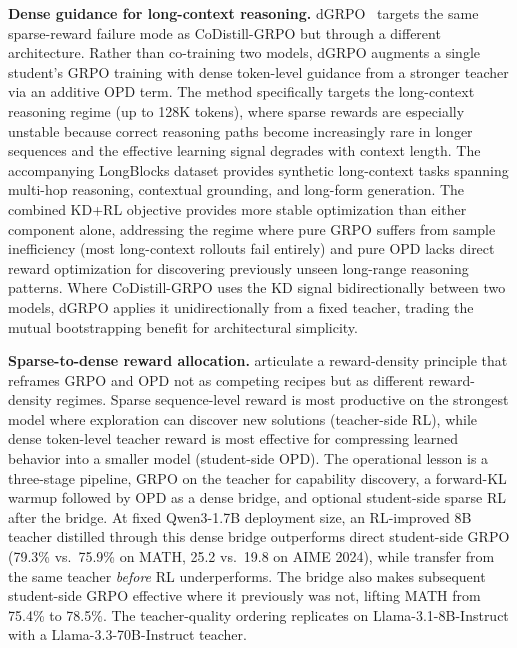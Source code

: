\documentclass{article} %
\begin{document}
\textbf{Dense guidance for long-context reasoning.} dGRPO~\citep{2605.12227} targets the same sparse-reward failure mode as CoDistill-GRPO but through a different architecture. Rather than co-training two models, dGRPO augments a single student's GRPO training with dense token-level guidance from a stronger teacher via an additive OPD term. The method specifically targets the long-context reasoning regime (up to 128K tokens), where sparse rewards are especially unstable because correct reasoning paths become increasingly rare in longer sequences and the effective learning signal degrades with context length. The accompanying LongBlocks dataset provides synthetic long-context tasks spanning multi-hop reasoning, contextual grounding, and long-form generation. The combined KD+RL objective provides more stable optimization than either component alone, addressing the regime where pure GRPO suffers from sample inefficiency (most long-context rollouts fail entirely) and pure OPD lacks direct reward optimization for discovering previously unseen long-range reasoning patterns. Where CoDistill-GRPO uses the KD signal bidirectionally between two models, dGRPO applies it unidirectionally from a fixed teacher, trading the mutual bootstrapping benefit for architectural simplicity.

\textbf{Sparse-to-dense reward allocation.} \citet{2605.12483} articulate a reward-density principle that reframes GRPO and OPD not as competing recipes but as different reward-density regimes. Sparse sequence-level reward is most productive on the strongest model where exploration can discover new solutions (teacher-side RL), while dense token-level teacher reward is most effective for compressing learned behavior into a smaller model (student-side OPD). The operational lesson is a three-stage pipeline, GRPO on the teacher for capability discovery, a forward-KL warmup followed by OPD as a dense bridge, and optional student-side sparse RL after the bridge. At fixed Qwen3-1.7B deployment size, an RL-improved 8B teacher distilled through this dense bridge outperforms direct student-side GRPO (79.3\% vs.\ 75.9\% on MATH, 25.2 vs.\ 19.8 on AIME 2024), while transfer from the same teacher \emph{before} RL underperforms. The bridge also makes subsequent student-side GRPO effective where it previously was not, lifting MATH from 75.4\% to 78.5\%. The teacher-quality ordering replicates on Llama-3.1-8B-Instruct with a Llama-3.3-70B-Instruct teacher.
\end{document}
